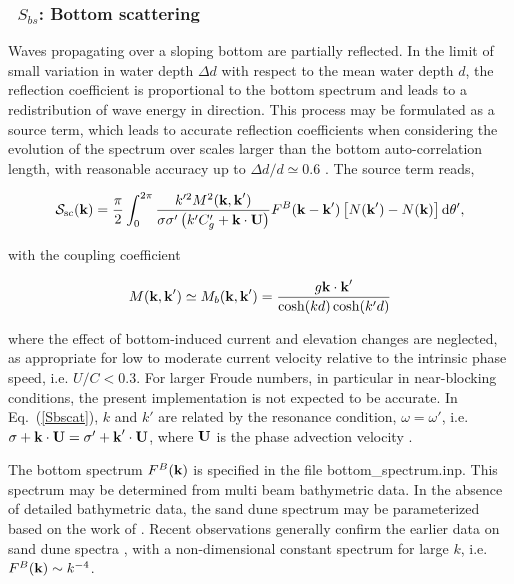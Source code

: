 \vsssub
\subsubsection{~$S_{bs}$: Bottom scattering} \label{sec:BS1}
\vsssub


\noindent
Waves propagating over a sloping bottom are partially reflected.  In the limit
of small variation in water depth $\Delta d$ with respect to the mean water
depth $d$, the reflection coefficient is proportional to the bottom spectrum
\cite{art:Kre49} and leads to a redistribution of wave energy in direction.
This process may be formulated as a source term, which leads to accurate
reflection coefficients when considering the evolution of the spectrum over
scales larger than the bottom auto-correlation length, with reasonable
accuracy up to $\Delta d / d \simeq 0.6$ \citep{art:AM07}. The source term
reads,

\begin{equation}
{\cal S}_{\mathrm{sc}}({\mbox{\bf k}}) =
\frac{\pi}{2}\int_{0}^{2 \pi}
 \frac{k'^2 M^2({\mbox{\bf k}},\textbf{k}')}{\sigma \sigma' \left(k' C'_g +
{\mbox{\bf k}}  \cdot {\bf U}  \right)}
 F^B({\mbox{\bf k}}-\textbf{k}')
\left[N(\textbf{k}')- N(\textbf{k})\right] {\mathrm d}
\theta',\label{Sbscat}
\end{equation}

\noindent
with the coupling coefficient

\begin{equation}
M({\mbox{\bf k}},{\mbox{\bf k}}^\prime)\simeq M_b({\mbox{\bf k}},{\mbox{\bf k}}^\prime) =\frac{g {\mbox{\bf k}}
\cdot {\mbox{\bf k}}^\prime}{\cosh(kd)\cosh(k'd)}
\end{equation}

\noindent 
where the effect of bottom-induced current and elevation changes are
neglected, as appropriate for low to moderate current velocity relative to the
intrinsic phase speed, i.e. $U/C < 0.3$. For larger Froude numbers, in
particular in near-blocking conditions, the present implementation is not
expected to be accurate.  In Eq.~(\ref{Sbscat}), $k$ and $k'$ are related by
the resonance condition, $\omega=\omega'$, i.e. $\sigma+{\mbox{\bf k}} \cdot {\bf U}
=\sigma' + {\mbox{\bf k}}^\prime \cdot {\bf U}$, where ${\bf U}$ is the phase advection
velocity \cite[see, e.g.,][]{tol:WISE07}.

The bottom spectrum $F^B({\mbox{\bf k}})$ is specified in the file {\file
bottom\_spectrum.inp}. This spectrum may be determined from multi beam
bathymetric data.  In the absence of detailed bathymetric data, the sand dune
spectrum may be parameterized based on the work of \cite{art:Hino68}.  Recent
observations generally confirm the earlier data on sand dune spectra
\citep{art:AM07}, with a non-dimensional constant spectrum for large $k$,
i.e. $F^B({\mbox{\bf k}}) \sim k^{-4}$.

